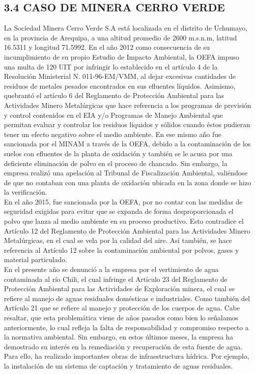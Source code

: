 \documentclass[12pt, a4paper]{article} %
\begin{document}
\begin{multicols}{2}
            \subsection*{3.4 CASO DE MINERA CERRO VERDE}
            La Sociedad Minera Cerro Verde S.A está localizada en el distrito de Uchumayo, en la provincia de Arequipa, a una altitud promedio de 2600 m.s.n.m, latitud 16.5311 y longitud 71.5992.  En el año 2012 como consecuencia de su incumplimiento de su propio Estudio de Impacto Ambiental, la OEFA impuso una multa de 120 UIT por infringir lo establecido en el artículo 4 de la Resolución Ministerial N. 011-96-EM/VMM, al dejar excesivas cantidades de residuos de metales pesados encontrados en sus efluentes líquidos. Asimismo, quebrantó el artículo 6 del Reglamento de Protección Ambiental para las Actividades Minero Metalúrgicas que hace referencia a los programas de previsión y control contenidos en el EIA y/o Programas de Manejo Ambiental que permitan evaluar y controlar los residuos líquidos y sólidos cuando éstos pudieran tener un efecto negativo sobre el medio ambiente. En ese mismo año fue sancionada por el MINAM a través de la OEFA, debido a la contaminación de los suelos con efluentes de la planta de oxidación y también se le acusa por una deficiente eliminación de polvo en el proceso de chancado. Sin embargo, la empresa realizó una apelación al Tribunal de Fiscalización Ambiental, valiéndose de que no contaban con una planta de oxidación ubicada en la zona donde se hizo la verificación. \\En el año 2015, fue sancionada por la OEFA, por no contar con las medidas de seguridad exigidas para evitar que se expanda de forma desproporcionada el polvo que lanza al medio ambiente en su proceso productivo. Esto contradice el Artículo 12 del Reglamento de Protección Ambiental para las Actividades Minero Metalúrgicas, en el cual se vela por la calidad del aire. Así también, se hace referencia al Artículo 12 sobre la contaminación ambiental por polvos, gases y material particulado. \\En el presente año se denunció a la empresa por el vertimiento de agua contaminada al río Chili, el cual infringe el Artículo 23 del Reglamento de Protección Ambiental para las Actividades de Exploración minera, el cual se refiere al manejo de aguas residuales domésticas e industriales. Como también del Artículo 21 que se refiere al manejo y protección de los cuerpos de agua. Cabe resaltar, que esta problemática viene de años pasados como bien lo señalamos anteriormente, lo cual refleja la falta de responsabilidad y compromiso respecto a la normativa ambiental. Sin embargo, en estos últimos meses, la empresa ha demostrado su interés en la remediación y recuperación de esta fuente de agua. Para ello, ha realizado importantes obras de infraestructura hídrica. Por ejemplo, la instalación de un sistema de captación y tratamiento de aguas residuales.


\end{multicols}
\end{document}

